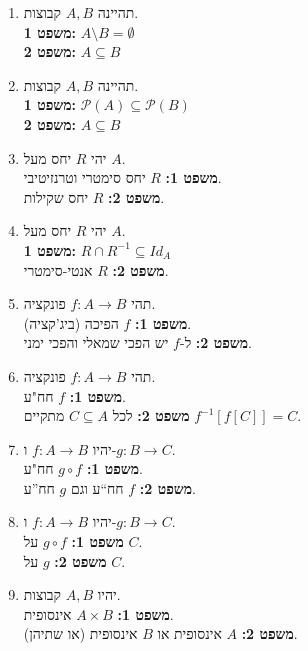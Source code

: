 \documentclass[a4paper,11pt]{article}
\newcommand{\powerset}{\mathcal{P}}
\begin{document}
\begin{enumerate}
    \item תהיינה \(A, B\) קבוצות.
          \\ \textbf{משפט 1:} \(A \setminus B = \emptyset\)
          \\ \textbf{משפט 2:} \(A \subseteq B\)

    \item תהיינה \(A, B\) קבוצות.
          \\ \textbf{משפט 1:} \(\powerset(A) \subseteq \powerset(B)\)
          \\ \textbf{משפט 2:} \(A \subseteq B\)

    \item יהי \(R\) יחס מעל \(A\).
          \\ \textbf{משפט 1:} \(R\) יחס סימטרי וטרנזיטיבי.
          \\ \textbf{משפט 2:} \(R\) יחס שקילות.

    \item יהי \(R\) יחס מעל \(A\).
          \\ \textbf{משפט 1:} \(R \cap R^{-1} \subseteq Id_A\)
          \\ \textbf{משפט 2:} \(R\) אנטי-סימטרי.

    \item תהי \(f: A \to B\) פונקציה.
          \\ \textbf{משפט 1:} \(f\) הפיכה (ביג'קציה).
          \\ \textbf{משפט 2:} ל-\(f\) יש הפכי שמאלי והפכי ימני.

    \item תהי \(f: A \to B\) פונקציה.
          \\ \textbf{משפט 1:} \(f\) חח"ע.
          \\ \textbf{משפט 2:} לכל \(C \subseteq A\) מתקיים \(f^{-1}[f[C]] = C\).

    \item יהיו \(f: A \to B\) ו-\(g: B \to C\).
          \\ \textbf{משפט 1:} \(g \circ f\) חח"ע.
          \\ \textbf{משפט 2:} \(f\) חח``ע וגם \(g\) חח''ע.

    \item יהיו \(f: A \to B\) ו-\(g: B \to C\).
          \\ \textbf{משפט 1:} \(g \circ f\) על \(C\).
          \\ \textbf{משפט 2:} \(g\) על \(C\).

    \item יהיו \(A, B\) קבוצות.
          \\ \textbf{משפט 1:} \(A \times B\) אינסופית.
          \\ \textbf{משפט 2:} \(A\) אינסופית או \(B\) אינסופית (או שתיהן).


\end{enumerate}
\end{document}
